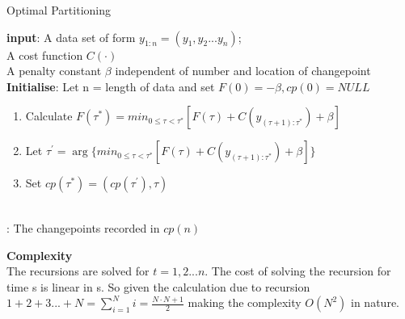\documentclass{article}
\begin{document}
\begin{algorithm}
\caption{Optimal Partitioning}\label{alg:cap}

\textbf{input}: A data set of form $y_{1:n} = (y_{1},y_{2}...y_{n})$;\\
\qquad \quad  A cost function $C(\cdot)$\\
\qquad \quad  A penalty constant $\beta$ independent of number and location of changepoint\\
\textbf{Initialise}: Let n = length of data and set $F(0) = -\beta, cp(0) = NULL$\\
\begin{algorithmic}
    \begin{enumerate}
        \item Calculate $F(\tau^{*}) = min_{0 \leq \tau < \tau^{*}} [F(\tau) + C(y_{(\tau+1) : \tau^{*}}) + \beta]$
        \item Let $\tau^{'} = \arg\{min_{0 \leq \tau < \tau^{*}} [F(\tau) + C(y_{(\tau+1) : \tau^{*}}) + \beta]\}$
        \item Set $ cp(\tau^{*}) = (cp(\tau^{'}) , \tau)$
    \end{enumerate}
\EndFor\\
\Return : The changepoints recorded in $cp(n)$ 
\end{algorithmic}
\end{algorithm}


\textbf{Complexity}\\
The recursions are solved for $t = 1,2...n$. The cost of solving the recursion for time s is linear in s. So given the calculation due to recursion $1+2+3...+N = \sum_{i=1}^{N}i = \frac{N\cdot N+1}{2}$ making the complexity $O(N^{2})$ in nature.
\clearpage
\end{document}

